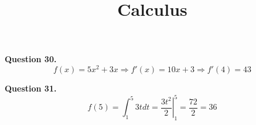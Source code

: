 \documentclass{ximera}
\title{Calculus}
\begin{document}
\maketitle

\textbf{Question 30.} 
\begin{equation*}
f(x) = 5x^2 + 3x \Rightarrow f'(x) = 10 x + 3 \Rightarrow f'(4) = 43
\end{equation*}

\textbf{Question 31.}
\begin{equation*}
f(5) = \int_1^5 3t dt = \left. \frac{3t^2}{2} \right|_1^5 = \frac{72}{2} = 36
\end{equation*}
\end{document}
